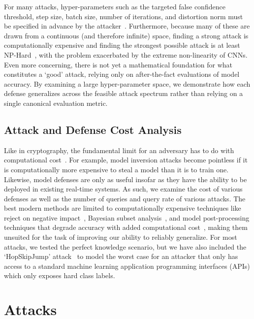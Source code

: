 \documentclass[journal]{IEEEtran}
\begin{document}
For many attacks, hyper-parameters such as the targeted false confidence threshold, step size, batch size, number of iterations, and distortion norm must be specified in advance by the attacker~\cite{carlini_towards_2017}. Furthermore, because many of these are drawn from a continuous (and therefore infinite) space, finding a strong attack is computationally expensive and finding the strongest possible attack is at least NP-Hard~\cite{carlini_towards_2017}, with the problem exacerbated by the extreme non-linearity of CNNs. Even more concerning, there is not yet a mathematical foundation for what constitutes a `good' attack, relying only on after-the-fact evaluations of model accuracy. By examining a large hyper-parameter space, we demonstrate how each defense generalizes across the feasible attack spectrum rather than relying on a single canonical evaluation metric.

\subsection{Attack and Defense Cost Analysis}

Like in cryptography, the fundamental limit for an adversary has to do with computational cost~\cite{hoffstein_pipher_silverman_2010}. For example, model inversion attacks become pointless if it is computationally more expensive to steal a model than it is to train one. Likewise, model defenses are only as useful insofar as they have the ability to be deployed in existing real-time systems. As such, we examine the cost of various defenses as well as the number of queries and query rate of various attacks. The best modern methods are limited to computationally expensive techniques like reject on negative impact~\cite{nelson2010behavior}, Bayesian subset analysis~\cite{bect_bayesian_2017}, and model post-processing techniques that degrade accuracy with added computational cost~\cite{athalye_obfuscated_2018, papernot, li_general_2016}, making them unsuited for the task of improving our ability to reliably generalize. For most attacks, we tested the perfect knowledge scenario, but we have also included the `HopSkipJump' attack~\cite{hopskipjump} to model the worst case for an attacker that only has access to a standard machine learning application programming interfaces (APIs) which only exposes hard class labels.


\section{Attacks}
\label{attacks}
\end{document}
